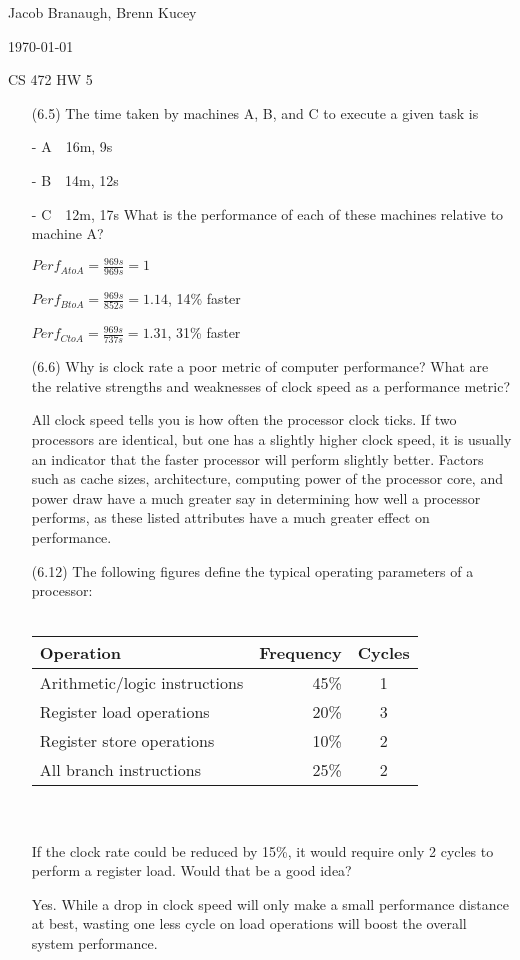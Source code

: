 \documentclass[letterpaper,10pt,titlepage]{article}
\def\name{Jacob Branaugh, Brenn Kucey}
\begin{document}
\hfill \name

\hfill \today

\hfill CS 472 HW 5

\begin{enumerate}
	\item[(6.5)] The time taken by machines A, B, and C to execute a given task is
	\item[-] A\ \ 16m, 9s
	\item[-] B\ \ 14m, 12s
	\item[-] C\ \ 12m, 17s
		What is the performance of each of these machines relative to machine A?
	\item[\textbullet] $Perf_{AtoA} = \frac{969s}{969s} = 1$
	\item[\textbullet] $Perf_{BtoA} = \frac{969s}{852s} = 1.14$, 14\% faster
	\item[\textbullet] $Perf_{CtoA} = \frac{969s}{737s} = 1.31$, 31\% faster

	\item[(6.6)] Why is clock rate a poor metric of computer performance? What are the
		relative strengths and weaknesses of clock speed as a performance metric?
	\item[\textbullet] All clock speed tells you is how often the processor clock
		ticks. If two processors are identical, but one has a slightly higher
		clock speed, it is usually an indicator that the faster processor will
		perform slightly better. Factors such as cache sizes, architecture,
		computing power of the processor core, and power draw have a much greater
		say in determining how well a processor performs, as these listed
		attributes have a much greater effect on performance.

	\item[(6.12)] The following figures define the typical operating parameters of a
		processor:\\
		\\
		\begin{tabular}{ l r c }
			Operation & Frequency & Cycles \\
			\hline
			Arithmetic/logic instructions & 45\% & 1 \\
			     Register load operations & 20\% & 3 \\
			    Register store operations & 10\% & 2 \\
			      All branch instructions & 25\% & 2 \\
		\end{tabular} \\ \\
		If the clock rate could be reduced by 15\%, it would require only 2 cycles
		to perform a register load. Would that be a good idea?
	\item[\textbullet]  Yes. While a drop in clock speed will only make a small
		performance distance at best, wasting one less cycle on load operations
		will boost the overall system performance. 


\end{enumerate}
\end{document}
